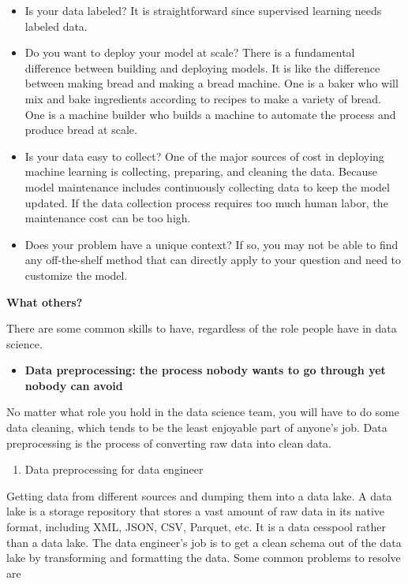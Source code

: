 \documentclass[
  12pt,
]{krantz}
\providecommand{\tightlist}{%
  \setlength{\itemsep}{0pt}\setlength{\parskip}{0pt}}
\begin{document}
\begin{itemize}
\item
  Is your data labeled? It is straightforward since supervised learning needs labeled data.
\item
  Do you want to deploy your model at scale? There is a fundamental difference between building and deploying models. It is like the difference between making bread and making a bread machine. One is a baker who will mix and bake ingredients according to recipes to make a variety of bread. One is a machine builder who builds a machine to automate the process and produce bread at scale.
\item
  Is your data easy to collect? One of the major sources of cost in deploying machine learning is collecting, preparing, and cleaning the data. Because model maintenance includes continuously collecting data to keep the model updated. If the data collection process requires too much human labor, the maintenance cost can be too high.
\item
  Does your problem have a unique context? If so, you may not be able to find any off-the-shelf method that can directly apply to your question and need to customize the model.
\end{itemize}

\textbf{What others?}

There are some common skills to have, regardless of the role people have in data science.

\begin{itemize}
\tightlist
\item
  \textbf{Data preprocessing: the process nobody wants to go through yet nobody can avoid}
\end{itemize}

No matter what role you hold in the data science team, you will have to do some data cleaning, which tends to be the least enjoyable part of anyone's job. Data preprocessing is the process of converting raw data into clean data.

\begin{enumerate}
\def\labelenumi{(\arabic{enumi})}
\tightlist
\item
  Data preprocessing for data engineer
\end{enumerate}

Getting data from different sources and dumping them into a data lake. A data lake is a storage repository that stores a vast amount of raw data in its native format, including XML, JSON, CSV, Parquet, etc. It is a data cesspool rather than a data lake. The data engineer's job is to get a clean schema out of the data lake by transforming and formatting the data. Some common problems to resolve are
\end{document}
